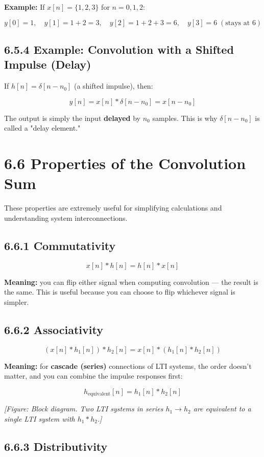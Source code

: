 \documentclass[11pt]{article}
\begin{document}
\textbf{Example:} If $x[n] = \{1,2,3\}$ for $n=0,1,2$:

\[y[0] = 1, \quad y[1] = 1+2 = 3, \quad y[2] = 1+2+3 = 6, \quad y[3] = 6\;(\text{stays at } 6)\]

\subsection*{6.5.4 Example: Convolution with a Shifted Impulse (Delay)}

If $h[n] = \delta[n - n_0]$ (a shifted impulse), then:

\[y[n] = x[n]*\delta[n-n_0] = x[n-n_0]\]

The output is simply the input \textbf{delayed} by $n_0$ samples. This is why $\delta[n-n_0]$ is called a "delay element."

\section*{6.6 Properties of the Convolution Sum}

These properties are extremely useful for simplifying calculations and understanding system interconnections.

\subsection*{6.6.1 Commutativity}

\[x[n]*h[n] = h[n]*x[n]\]

\textbf{Meaning:} you can flip either signal when computing convolution — the result is the same. This is useful because you can choose to flip whichever signal is simpler.

\subsection*{6.6.2 Associativity}

\[(x[n]*h_1[n])*h_2[n] = x[n]*(h_1[n]*h_2[n])\]

\textbf{Meaning:} for \textbf{cascade (series)} connections of LTI systems, the order doesn't matter, and you can combine the impulse responses first:

\[h_{\text{equivalent}}[n] = h_1[n]*h_2[n]\]

\textit{[Figure: Block diagram. Two LTI systems in series $h_1 \to h_2$ are equivalent to a single LTI system with $h_1 * h_2$.]}

\subsection*{6.6.3 Distributivity}
\end{document}
